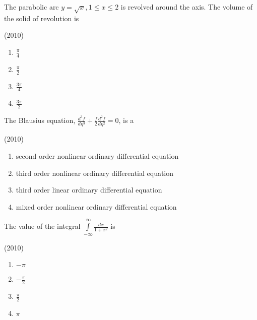 \iffalse
	\chapter{2010}
	\author{AI24BTECH11003}
	\section{me}
\fi
 
    \item The parabolic arc $y=\sqrt{x},1\leq x\leq2$  is revolved around the axis. The volume of the solid of revolution is
    
    \hfill{(2010)}

        \begin{multicols}{4}
            \begin{enumerate}
                \item $\frac{\pi}{4}$
                \item $\frac{\pi}{2}$
                \item $\frac{3\pi}{4}$
                \item $\frac{3\pi}{2}$
            \end{enumerate}
        \end{multicols}

    \item The Blausius equation, $\frac{d^3f}{d\eta^3}+\frac{f}{2}\frac{d^2f}{d\eta^2}=0$, is a 
    
    \hfill{(2010)}


            \begin{enumerate}
                \item second order nonlinear ordinary differential equation
                \item third order nonlinear ordinary differential equation
                \item third order linear ordinary differential equation
                \item mixed order nonlinear ordinary differential equation
            \end{enumerate}


    \item The value of the integral $\overset{\infty}{\underset{-\infty}{\int}}\frac{dx}{1+x^2}$ is
    
    \hfill{(2010)}

        \begin{multicols}{4}
            \begin{enumerate}
                \item $-\pi$
                \item $-\frac{\pi}{2}$
                \item $\frac{\pi}{2}$
                \item $\pi$
            \end{enumerate}
        \end{multicols}


